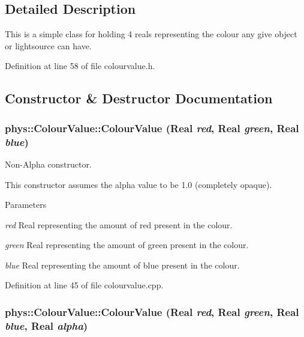 \subsection{Detailed Description}
This is a simple class for holding 4 reals representing the colour any give object or lightsource can have. 

Definition at line 58 of file colourvalue.h.



\subsection{Constructor \& Destructor Documentation}
\hypertarget{classphys_1_1ColourValue_ac63b5fbf1b35b1855330ed5737fc16e0}{
\subsubsection[{ColourValue}]{\setlength{\rightskip}{0pt plus 5cm}phys::ColourValue::ColourValue ({\bf Real} {\em red}, \/  {\bf Real} {\em green}, \/  {\bf Real} {\em blue})}}
\label{d3/db0/classphys_1_1ColourValue_ac63b5fbf1b35b1855330ed5737fc16e0}


Non-\/Alpha constructor. 

This constructor assumes the alpha value to be 1.0 (completely opaque). 
\begin{DoxyParams}{Parameters}
\item[{\em red}]Real representing the amount of red present in the colour. \item[{\em green}]Real representing the amount of green present in the colour. \item[{\em blue}]Real representing the amount of blue present in the colour. \end{DoxyParams}


Definition at line 45 of file colourvalue.cpp.

\hypertarget{classphys_1_1ColourValue_a28ee2493cd6a7bb8bc4104d223e3e709}{
\subsubsection[{ColourValue}]{\setlength{\rightskip}{0pt plus 5cm}phys::ColourValue::ColourValue ({\bf Real} {\em red}, \/  {\bf Real} {\em green}, \/  {\bf Real} {\em blue}, \/  {\bf Real} {\em alpha})}}
\label{d3/db0/classphys_1_1ColourValue_a28ee2493cd6a7bb8bc4104d223e3e709}


